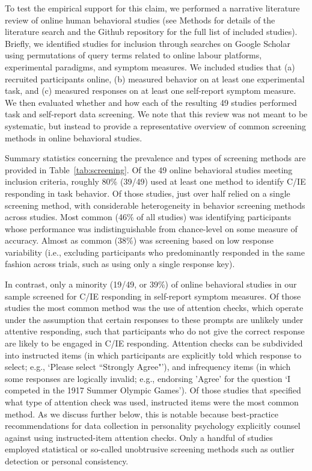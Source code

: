 \documentclass[a4paper,notitlepage,12pt]{article}
\begin{document}
To test the empirical support for this claim, we performed a narrative literature review of online human behavioral studies (see Methods for details of the literature search and the Github repository for the full list of included studies). Briefly, we identified studies for inclusion through searches on Google Scholar using permutations of query terms related to online labour platforms, experimental paradigms, and symptom measures. We included studies that (a) recruited participants online, (b) measured behavior on at least one experimental task, and (c) measured responses on at least one self-report symptom measure. We then evaluated whether and how each of the resulting 49 studies performed task and self-report data screening. We note that this review was not meant to be systematic, but instead to provide a representative overview of common screening methods in online behavioral studies.

Summary statistics concerning the prevalence and types of screening methods are provided in Table~\ref{tab:screening}. Of the 49 online behavioral studies meeting inclusion criteria, roughly 80\% (39/49) used at least one method to identify C/IE responding in task behavior. Of those studies, just over half relied on a single screening method, with considerable heterogeneity in behavior screening methods across studies. Most common (46\% of all studies) was identifying participants whose performance was indistinguishable from chance-level on some measure of accuracy. Almost as common (38\%) was screening based on low response variability (i.e., excluding participants who predominantly responded in the same fashion across trials, such as using only a single response key).

In contrast, only a minority (19/49, or 39\%) of online behavioral studies in our sample screened for C/IE responding in self-report symptom measures. Of those studies the most common method was the use of attention checks, which operate under the assumption that certain responses to these prompts are unlikely under attentive responding, such that participants who do not give the correct response are likely to be engaged in C/IE responding. Attention checks can be subdivided into instructed items (in which participants are explicitly told which response to select; e.g., `Please select ``Strongly Agree"'), and infrequency items (in which some responses are logically invalid; e.g., endorsing 'Agree' for the question `I competed in the 1917 Summer Olympic Games'). Of those studies that specified what type of attention check was used, instructed items were the most common method. As we discuss further below, this is notable because best-practice recommendations for data collection in personality psychology explicitly counsel against using instructed-item attention checks. Only a handful of studies employed statistical or so-called unobtrusive screening methods such as outlier detection or personal consistency. 
\end{document}
